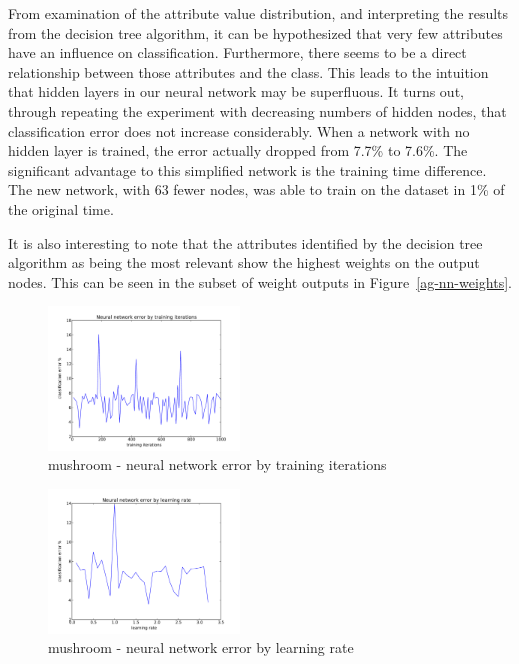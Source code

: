\documentclass{sig-alternate}
\begin{document}
From examination of the attribute value distribution, and interpreting the results from the decision tree algorithm, it can be hypothesized that very few attributes have an influence on classification. Furthermore, there seems to be a direct relationship between those attributes and the class. This leads to the intuition that hidden layers in our neural network may be superfluous. It turns out, through repeating the experiment with decreasing numbers of hidden nodes, that classification error does not increase considerably. When a network with no hidden layer is trained, the error actually dropped from 7.7\% to 7.6\%. The significant advantage to this simplified network is the training time difference. The new network, with 63 fewer nodes, was able to train on the dataset in 1\% of the original time.

It is also interesting to note that the attributes identified by the decision tree algorithm as being the most relevant show the highest weights on the output nodes. This can be seen in the subset of weight outputs in Figure~\ref{ag-nn-weights}.


\begin{figure}[!htbp]
    \centering
    \includegraphics[width=2in]{data/agaricus-lepiota/perceptron/training-iterations.pdf}
    \caption{mushroom - neural network error by training iterations \label{ag-nn-ti}}
\end{figure} 

\begin{figure}[!htbp]
    \centering
    \includegraphics[width=2in]{data/agaricus-lepiota/perceptron/learning-rate.pdf}
    \caption{mushroom - neural network error by learning rate \label{ag-nn-lr}}
\end{figure} 
\end{document}
